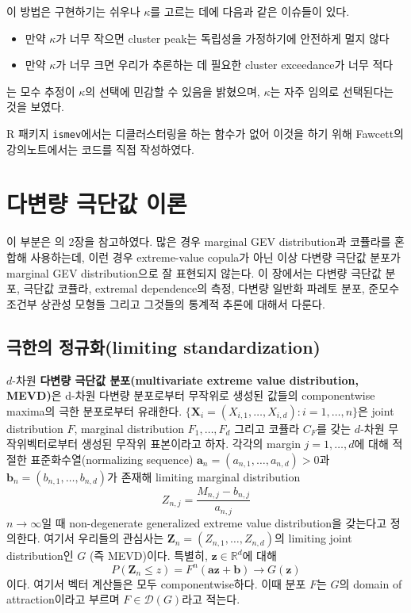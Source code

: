 \documentclass[b5paper,]{scrbook}
\theoremstyle{plain}
\theoremstyle{definition}
\numberwithin{equation}{section}
\begin{document}
이 방법은 구현하기는 쉬우나 \(\kappa\)를 고르는 데에 다음과 같은 이슈들이 있다.

\begin{itemize}
\item
  만약 \(\kappa\)가 너무 작으면 cluster peak는 독립성을 가정하기에 안전하게 멀지 않다
\item
  만약 \(\kappa\)가 너무 크면 우리가 추론하는 데 필요한 cluster exceedance가 너무 적다
\end{itemize}

\citep{Fawcett2012}는 모수 추정이 \(\kappa\)의 선택에 민감할 수 있음을 밝혔으며, \(\kappa\)는 자주 임의로 선택된다는 것을 보였다.

R 패키지 \texttt{ismev}에서는 디클러스터링을 하는 함수가 없어 이것을 하기 위해 Fawcett의 강의노트에서는 코드를 직접 작성하였다.

\hypertarget{mevtheory}{%
\chapter{다변량 극단값 이론}\label{mevtheory}}

이 부분은 \citep{Dey2015}의 2장을 참고하였다. 많은 경우 marginal GEV distribution과 코퓰라를 혼합해 사용하는데, 이런 경우 extreme-value copula가 아닌 이상 다변량 극단값 분포가 marginal GEV distribution으로 잘 표현되지 않는다. 이 장에서는 다변량 극단값 분포, 극단값 코퓰라, extremal dependence의 측정, 다변량 일반화 파레토 분포, 준모수 조건부 상관성 모형들 그리고 그것들의 통계적 추론에 대해서 다룬다.

\hypertarget{-limiting-standardization}{%
\section{극한의 정규화(limiting standardization)}\label{-limiting-standardization}}

\(d\)-차원 \textbf{다변량 극단값 분포(multivariate extreme value distribution, MEVD)}은 d-차원 다변량 분포로부터 무작위로 생성된 값들의 componentwise maxima의 극한 분포로부터 유래한다. \(\{\mathbf{X}_{i} = (X_{i,1},\ldots, X_{i,d}):i=1,\ldots, n\}\)은 joint distribution \(F\), marginal distribution \(F_{1}, \ldots, F_{d}\) 그리고 코퓰라 \(C_{F}\)를 갖는 \(d\)-차원 무작위벡터로부터 생성된 무작위 표본이라고 하자. 각각의 margin \(j=1,\ldots, d\)에 대해 적절한 표준화수열(normalizing sequence) \(\mathbf{a}_{n}=(a_{n,1},\ldots, a_{n,d})>0\)과 \(\mathbf{b}_{n}=(b_{n,1},\ldots, b_{n,d})\)가 존재해 limiting marginal distribution
\[Z_{n,j} = \frac{M_{n,j}-b_{n,j}}{a_{n,j}}\]
\(n\rightarrow\infty\)일 때 non-degenerate generalized extreme value distribution을 갖는다고 정의한다. 여기서 우리들의 관심사는 \(\mathbf{Z}_{n}=(Z_{n,1},\ldots, Z_{n,d})\)의 limiting joint distribution인 \(G\) (즉 MEVD)이다. 특별히, \(\mathbf{z}\in\mathbb{R}^{d}\)에 대해
\[P(\mathbf{Z}_{n}\leq z)=F^{n}(\mathbf{az} +\mathbf{b}) \rightarrow G(\mathbf{z})\]
이다. 여기서 벡터 계산들은 모두 componentwise하다. 이때 분포 \(F\)는 \(G\)의 domain of attraction이라고 부르며 \(F\in\mathcal{D}(G)\)라고 적는다.
\end{document}
